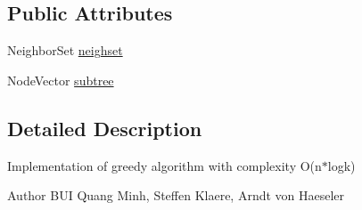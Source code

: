 \subsection*{Public Attributes}
\begin{DoxyCompactItemize}
\item 
NeighborSet \hyperlink{classGreedy_a56a5f478b16b0da1304d79d03d390ab0}{neighset}
\item 
NodeVector \hyperlink{classGreedy_ac7f2cff520d775503d290e236fce8baf}{subtree}
\end{DoxyCompactItemize}


\subsection{Detailed Description}
Implementation of greedy algorithm with complexity O(n$\ast$logk) \begin{DoxyAuthor}{Author}
BUI Quang Minh, Steffen Klaere, Arndt von Haeseler 
\end{DoxyAuthor}


